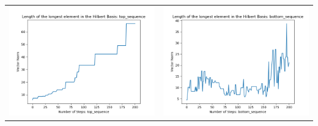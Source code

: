 \documentclass[10pt]{article}
\begin{document}
\begin{tabular}{c|c}
\begin{minipage}{.4\textwidth}
\includegraphics[width=\textwidth]{"DATA/5d/6 generators 2 bound G/top_sequence LENGTH"}
\end{minipage} &
\begin{minipage}{.4\textwidth}
\includegraphics[width=\textwidth]{"DATA/5d/6 generators 2 bound G bottomup/bottom_sequence LENGTH"}
\end{minipage}
\end{tabular}
\end{document}

